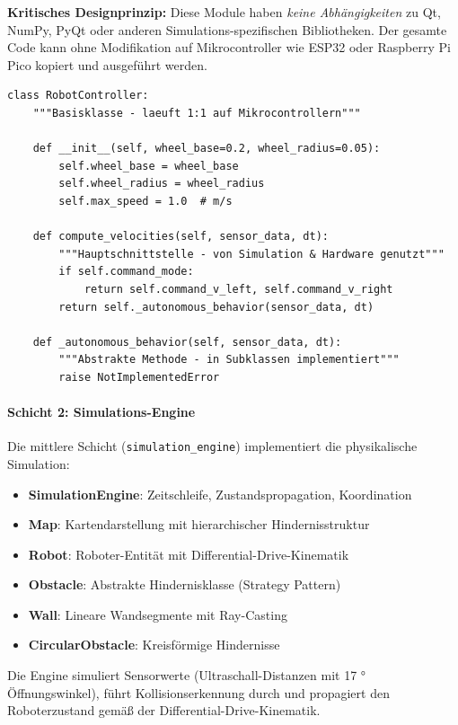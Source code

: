 ﻿\documentclass[a4paper,12pt]{article}
\theoremstyle{definition}
\begin{document}
\textbf{Kritisches Designprinzip:} Diese Module haben \emph{keine Abhängigkeiten} zu Qt, NumPy, PyQt oder anderen Simulations-spezifischen Bibliotheken. Der gesamte Code kann ohne Modifikation auf Mikrocontroller wie ESP32 oder Raspberry Pi Pico kopiert und ausgeführt werden.

\begin{lstlisting}[style=pythonstyle, caption={Abstrakte Basisklasse für maximale Wiederverwendbarkeit}]
class RobotController:
    """Basisklasse - laeuft 1:1 auf Mikrocontrollern"""
    
    def __init__(self, wheel_base=0.2, wheel_radius=0.05):
        self.wheel_base = wheel_base
        self.wheel_radius = wheel_radius
        self.max_speed = 1.0  # m/s
    
    def compute_velocities(self, sensor_data, dt):
        """Hauptschnittstelle - von Simulation & Hardware genutzt"""
        if self.command_mode:
            return self.command_v_left, self.command_v_right
        return self._autonomous_behavior(sensor_data, dt)
    
    def _autonomous_behavior(self, sensor_data, dt):
        """Abstrakte Methode - in Subklassen implementiert"""
        raise NotImplementedError
\end{lstlisting}

\paragraph{Schicht 2: Simulations-Engine}

Die mittlere Schicht (\texttt{simulation\_engine}) implementiert die physikalische Simulation:

\begin{itemize}
	\item \textbf{SimulationEngine}: Zeitschleife, Zustandspropagation, Koordination
	\item \textbf{Map}: Kartendarstellung mit hierarchischer Hindernisstruktur
	\item \textbf{Robot}: Roboter-Entität mit Differential-Drive-Kinematik
	\item \textbf{Obstacle}: Abstrakte Hindernisklasse (Strategy Pattern)
	\item \textbf{Wall}: Lineare Wandsegmente mit Ray-Casting
	\item \textbf{CircularObstacle}: Kreisförmige Hindernisse
\end{itemize}

Die Engine simuliert Sensorwerte (Ultraschall-Distanzen mit 17 ° Öffnungswinkel), führt Kollisionserkennung durch und propagiert den Roboterzustand gemäß der Differential-Drive-Kinematik.
\end{document}

